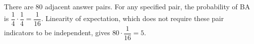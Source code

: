 There are $80$ adjacent answer pairs. For any specified pair, the probability of BA is $\dfrac{1}{4}\cdot\dfrac{1}{4}=\dfrac{1}{16}$. Linearity of expectation, which does not require these pair indicators to be independent, gives $80\cdot\dfrac{1}{16}=\boxed5$.
